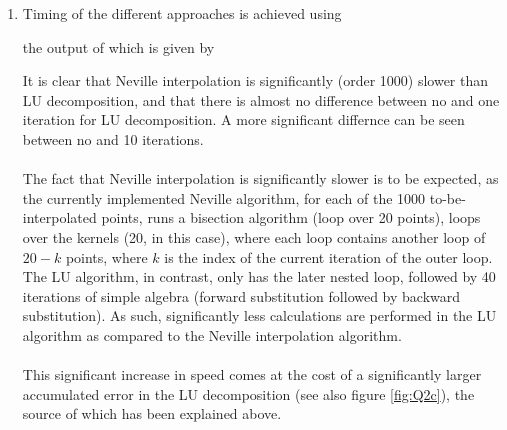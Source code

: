 \begin{enumerate}[label=(\alph*)]
\item Timing of the different approaches is achieved using

the output of which is given by

It is clear that Neville interpolation is significantly (order 1000) slower than LU decomposition, and that there is almost no difference between no and one iteration for LU decomposition. A more significant differnce can be seen between no and 10 iterations.\\
\\
The fact that Neville interpolation is significantly slower is to be expected, as the currently implemented Neville algorithm, for each of the 1000 to-be-interpolated points, runs a bisection algorithm (loop over 20 points), loops over the kernels (20, in this case), where each loop contains another loop of $20-k$ points, where $k$ is the index of the current iteration of the outer loop. The LU algorithm, in contrast, only has the later nested loop, followed by 40 iterations of simple algebra (forward substitution followed by backward substitution). As such, significantly less calculations are performed in the LU algorithm as compared to the Neville interpolation algorithm. \\
\\
This significant increase in speed comes at the cost of a significantly larger accumulated error in the LU decomposition (see also figure \ref{fig:Q2c}), the source of which has been explained above. 
\end{enumerate}
